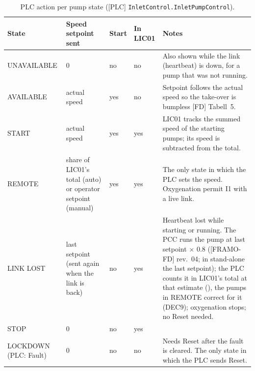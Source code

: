 \documentclass[11pt,a4paper]{article}
\begin{document}
\begin{table}[htbp]
\centering\small
\caption{PLC action per pump state ([PLC] \texttt{InletControl.InletPumpControl}).}
\label{tab:states}
\begin{tabularx}{\textwidth}{@{}P{25mm}P{36mm}P{12mm}P{13mm}L@{}}
\toprule
State & Speed setpoint sent & Start & In LIC01 & Notes \\
\midrule
UNAVAILABLE & 0 & no & no & Also shown while the link (heartbeat) is down, for a pump that was not running. \\
AVAILABLE & actual speed & yes & no & Setpoint follows the actual speed so the take-over is bumpless [FD] Tabell~5. \\
START & actual speed & yes & yes & LIC01 tracks the summed speed of the starting pumps; its speed is subtracted from the total. \\
REMOTE & share of LIC01's total (auto) or operator setpoint (manual) & yes & yes & The only state in which the PLC sets the speed. Oxygenation permit I1 with a live link. \\
LINK LOST & last setpoint (sent again when the link is back) & no & yes & Heartbeat lost while starting or running. The PCC runs the pump at last setpoint $\times$ 0.8 ([FRAMO-FD] rev.~04; in stand-alone the last setpoint); the PLC counts it in LIC01's total at that estimate (), the pumps in REMOTE correct for it (DEC9); oxygenation stops; no Reset needed. \\
STOP & 0 & no & yes & \\
LOCKDOWN (PLC: Fault) & 0 & no & no & Needs Reset after the fault is cleared. The only state in which the PLC sends Reset. \\
\bottomrule
\end{tabularx}
\end{table}
\end{document}
